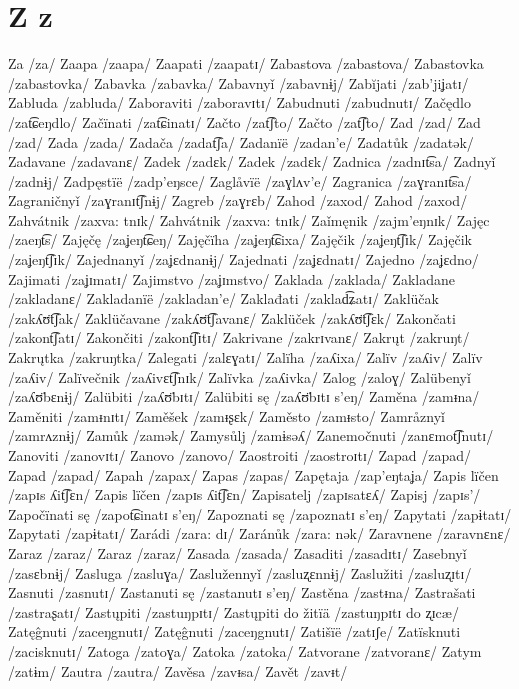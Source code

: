 \chapter{Z z}

Za /za/
Zaapa /zaapa/
Zaapati /zaapatɪ/
Zabastova /zabastova/
Zabastovka /zabastovka/
Zabavka /zabavka/
Zabavnyǐ /zabavnɨj/
Zabĭjati /zab’jiʝatɪ/
Zabluda /zabluda/
Zaboraviti /zaboravɪtɪ/
Zabudnuti /zabudnutɪ/
Začędlo /zat͡ɕeŋdlo/
Začïnati /zat͡ɕinatɪ/
Začto /zat͡ʃto/
Začto /zat͡ʃto/
Zad /zad/
Zad /zad/
Zada /zada/
Zadača /zadat͡ʃa/
Zadanïë /zadan’e/
Zadatůk /zadatək/
Zadavane /zadavanɛ/
Zadek /zadɛk/
Zadek /zadɛk/
Zadnica /zadnɪt͡sa/
Zadnyǐ /zadnɨj/
Zadpęstïë /zadp’eŋsce/
Zaglåvïë /zaɣlʌv’e/
Zagranica /zaɣranɪt͡sa/
Zagraničnyǐ /zaɣranɪt͡ʃnɨj/
Zagreb /zaɣrɛb/
Zahod /zaxod/
Zahod /zaxod/
Zahvátnik /zaxva: tnɪk/
Zahvátnik /zaxva: tnɪk/
Zaǐmęnik /zajm’eŋnɪk/
Zajęc /zaeŋt͡s/
Zajęčę /zaʝeŋt͡ɕeŋ/
Zajęčïha /zaʝeŋt͡ɕixa/
Zajęčik /zaʝeŋt͡ʃɪk/
Zajęčik /zaʝeŋt͡ʃɪk/
Zajednanyǐ /zaʝɛdnanɨj/
Zajednati /zaʝɛdnatɪ/
Zajedno /zaʝɛdno/
Zajimati /zaʝɪmatɪ/
Zajimstvo /zaʝɪmstvo/
Zaklada /zaklada/
Zakladane /zakladanɛ/
Zakladanïë /zakladan’e/
Zaklađati /zaklad͡ʑatɪ/
Zaklüčak /zakʎʊ̈t͡ʃak/
Zaklüčavane /zakʎʊ̈t͡ʃavanɛ/
Zaklüček /zakʎʊ̈t͡ʃɛk/
Zakončati /zakont͡ʃatɪ/
Zakončiti /zakont͡ʃɪtɪ/
Zakrivane /zakrɪvanɛ/
Zakrųt /zakruŋt/
Zakrųtka /zakruŋtka/
Zalegati /zalɛɣatɪ/
Zalïha /zaʎixa/
Zalïv /zaʎiv/
Zalïv /zaʎiv/
Zalïvečnik /zaʎivɛt͡ʃnɪk/
Zalïvka /zaʎivka/
Zalog /zaloɣ/
Zalübenyǐ /zaʎʊ̈bɛnɨj/
Zalübiti /zaʎʊ̈bɪtɪ/
Zalübiti sę /zaʎʊ̈bɪtɪ s’eŋ/
Zaměna /zamᵻna/
Zaměniti /zamᵻnɪtɪ/
Zaměšek /zamᵻʂɛk/
Zaměsto /zamᵻsto/
Zamråznyǐ /zamrʌznɨj/
Zamůk /zamək/
Zamysůlj /zamɨsəʎ/
Zanemočnuti /zanɛmot͡ʃnutɪ/
Zanoviti /zanovɪtɪ/
Zanovo /zanovo/
Zaostroiti /zaostroɪtɪ/
Zapad /zapad/
Zapad /zapad/
Zapah /zapax/
Zapas /zapas/
Zapętaja /zap’eŋtaʝa/
Zapis lïčen /zapɪs ʎit͡ʃɛn/
Zapis lïčen /zapɪs ʎit͡ʃɛn/
Zapisatelj /zapɪsatɛʎ/
Zapisj /zapɪs’/
Započïnati sę /zapot͡ɕinatɪ s’eŋ/
Zapoznati sę /zapoznatɪ s’eŋ/
Zapytati /zapɨtatɪ/
Zapytati /zapɨtatɪ/
Zarádi /zara: dɪ/
Zaránůk /zara: nək/
Zaravnene /zaravnɛnɛ/
Zaraz /zaraz/
Zaraz /zaraz/
Zasada /zasada/
Zasaditi /zasadɪtɪ/
Zasebnyǐ /zasɛbnɨj/
Zasluga /zasluɣa/
Zaslužennyǐ /zasluʐɛnnɨj/
Zaslužiti /zasluʐɪtɪ/
Zasnuti /zasnutɪ/
Zastanuti sę /zastanutɪ s’eŋ/
Zastěna /zastᵻna/
Zastrašati /zastraʂatɪ/
Zastųpiti /zastuŋpɪtɪ/
Zastųpiti do žitïä /zastuŋpɪtɪ do ʐɪcæ/
Zatęĝnuti /zaceŋgnutɪ/
Zatęĝnuti /zaceŋgnutɪ/
Zatišïë /zatɪʃe/
Zatïsknuti /zacisknutɪ/
Zatoga /zatoɣa/
Zatoka /zatoka/
Zatvorane /zatvoranɛ/
Zatym /zatɨm/
Zautra /zautra/
Zavěsa /zavᵻsa/
Zavět /zavᵻt/
